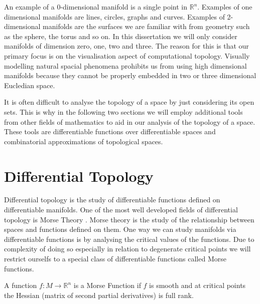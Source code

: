 An example of a 0-dimensional manifold is a single point in $\mathbb{R}^n$. Examples of one dimensional manifolds are lines, circles, graphs and curves. Examples of 2-dimensional manifolds are the surfaces we are familiar with from geometry such as the sphere, the torus and so on. In this dissertation we will only consider manifolds of dimension zero, one, two and three. The reason for this is that our primary focus is on the visualisation aspect of computational topology. Visually modelling natural spacial phenomena prohibits us from using high dimensional manifolds because they cannot be properly embedded in two or three dimensional Eucledian space.


It is often difficult to analyse the topology of a space by just considering its open sets. This is why in the following two sections we will employ additional tools from other fields of mathematics to aid in our analysis of the topology of a space. These tools are differentiable functions over differentiable spaces and combinatorial approximations of topological spaces.


\section{Differential Topology}

Differential topology is the study of differentiable functions defined on differentiable manifolds. One of the most well developed fields of differential topology is Morse Theory \cite{morse-theory-book, morse-theory-book-milnor}. Morse theory is the study of the relationship between spaces and functions defined on them. One way we can study manifolds via differentiable functions is by analysing the critical values of the functions. Due to complexity of doing so especially in relation to degenerate critical points we will restrict ourselfs to a special class of differentiable functions called Morse functions.



\begin{defn} A function $f: M \to \mathbb{R}^n$ is a Morse Function if $f$ is smooth and at critical points the Hessian (matrix of second partial derivatives) is full rank.   \end{defn}

